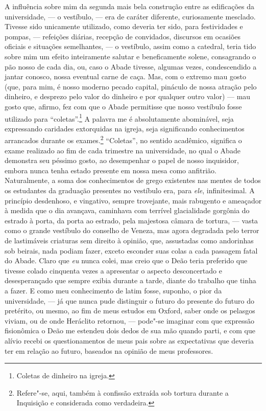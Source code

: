 A influência sobre mim da segunda mais bela construção entre as
edificações da universidade, --- o vestíbulo, --- era de caráter
diferente, curiosamente mesclado. Tivesse sido unicamente utilizado,
como deveria ter sido, para festividades e pompas, --- refeições diárias,
recepção de convidados, discursos em ocasiões oficiais e situações
semelhantes, --- o vestíbulo, assim como a catedral, teria tido sobre mim
um efeito inteiramente salutar e beneficamente solene, consagrando o pão
nosso de cada dia, ou, caso o Abade tivesse, algumas vezes,
condescendido a jantar conosco, nossa eventual carne de caça. Mas, com o
extremo mau gosto (que, para mim, é nosso moderno pecado capital,
pináculo de nossa atração pelo dinheiro, e desprezo pelo valor do
dinheiro e por qualquer outro valor) --- mau gosto que, afirmo, fez com
que o Abade permitisse que nosso vestíbulo fosse utilizado para
``coletas''.\footnote{Coletas de dinheiro na igreja.} A
palavra me é absolutamente abominável, seja expressando caridades
extorquidas na igreja, seja significando conhecimentos arrancados
durante os exames.\footnote{Refere"-se, aqui, também à confissão extraída
  sob tortura durante a Inquisição e considerada como verdadeira.} ``Coletas'', no sentido acadêmico, significa o exame
realizado ao fim de cada trimestre na universidade, no qual o Abade
demonstra seu péssimo gosto, ao desempenhar o papel de nosso inquisidor,
embora nunca tenha estado presente em nossa mesa como anfitrião.
Naturalmente, a soma dos conhecimentos de grego existentes nas mentes de
todos os estudantes da graduação presentes no vestíbulo era, para
\textit{ele}, infinitesimal. A princípio desdenhoso, e vingativo, sempre
trovejante, mais rabugento e ameaçador à medida que o dia avançava,
caminhava com terrível glacialidade gorgônia do estrado à porta, da
porta ao estrado, pela majestosa câmara de tortura, --- vasta como o
grande vestíbulo do conselho de Veneza, mas agora degradada pelo terror
de lastimáveis criaturas sem direito à opinião, que, assustadas como
andorinhas sob beirais, nada podiam fazer, exceto esconder suas colas a
cada passagem fatal do Abade. Claro que \textit{eu} nunca colei, mas creio
que o Deão teria preferido que tivesse colado cinquenta vezes a
apresentar o aspecto desconcertado e desesperançado que sempre exibia
durante a tarde, diante do trabalho que tinha a fazer. E como meu
conhecimento de latim fosse, suponho, o pior da universidade, --- já que
nunca pude distinguir o futuro do presente do futuro do pretérito, ou
mesmo, ao fim de meus estudos em Oxford, saber onde os pelasgos viviam,
ou de onde Heráclito retornou, --- pode"-se imaginar com que expressão
fisionômica o Deão me estendeu dois dedos de sua mão quando parti, e com
que alívio recebi os questionamentos de meus pais sobre as expectativas
que deveria ter em relação ao futuro, baseados na opinião de meus
professores.

